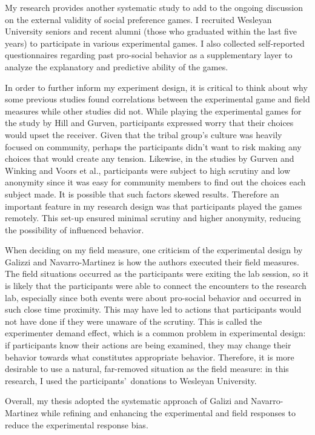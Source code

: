 \documentclass[12pt]{article}
\begin{document}
My research provides another systematic study to add to the ongoing discussion on the external validity of social preference games. I recruited Wesleyan University seniors and recent alumni (those who graduated within the last five years) to participate in various experimental games. I also collected self-reported questionnaires regarding past pro-social behavior as a supplementary layer to analyze the explanatory and predictive ability of the games.

In order to further inform my experiment design, it is critical to think about why some previous studies found correlations between the experimental game and field measures while other studies did not. While playing the experimental games for the study by Hill and Gurven, participants expressed worry that their choices would upset the receiver. Given that the tribal group\rq s culture was heavily focused on community, perhaps the participants didn\rq t want to risk making any choices that would create any tension. Likewise, in the studies by Gurven and Winking and Voors et al., participants were subject to high scrutiny and low anonymity since it was easy for community members to find out the choices each subject made. It is possible that such factors skewed results. Therefore an important feature in my research design was that participants played the games remotely. This set-up ensured minimal scrutiny and higher anonymity, reducing the possibility of influenced behavior.

When deciding on my field measure, one criticism of the experimental design by Galizzi and Navarro-Martinez is how the authors executed their field measures. The field situations occurred as the participants were exiting the lab session, so it is likely that the participants were able to connect the encounters to the research lab, especially since both events were about pro-social behavior and occurred in such close time proximity. This may have led to actions that participants would not have done if they were unaware of the scrutiny. This is called the experimenter demand effect, which is a common problem in experimental design: if participants know their actions are being examined, they may change their behavior towards what constitutes appropriate behavior. Therefore, it is more desirable to use a natural, far-removed situation as the field measure: in this research, I used the participants\rq \ donations to Wesleyan University.

Overall, my thesis adopted the systematic approach of Galizi and Navarro-Martinez while refining and enhancing the experimental and field responses to reduce the experimental response bias.
\end{document}
